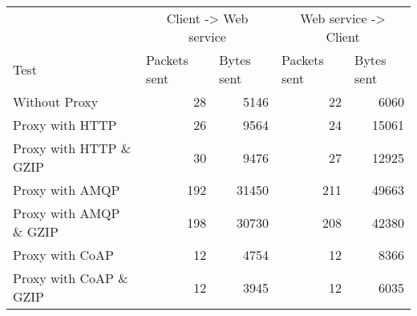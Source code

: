 \begin{tabular}{lrrrr}
\hline
\multicolumn{1}{l}{}                  & \multicolumn{2}{c}{Client -> Web service}                           & \multicolumn{2}{c}{Web service -> Client}                           \\
\multicolumn{1}{l}{Test} & \multicolumn{1}{l}{Packets sent} & \multicolumn{1}{l}{Bytes sent} & \multicolumn{1}{l}{Packets sent} & \multicolumn{1}{l}{Bytes sent} \\ \hline
Without Proxy                   & 28             & 5146           & 22             & 6060           \\
Proxy with HTTP                 & 26             & 9564           & 24             & 15061          \\
Proxy with HTTP \& GZIP         & 30             & 9476           & 27             & 12925          \\
Proxy with AMQP                 & 192            & 31450          & 211            & 49663          \\
Proxy with AMQP \& GZIP         & 198            & 30730          & 208            & 42380          \\
Proxy with CoAP                 & 12             & 4754           & 12             & 8366           \\
Proxy with CoAP \& GZIP         & 12             & 3945           & 12             & 6035           \\
\end{tabular}